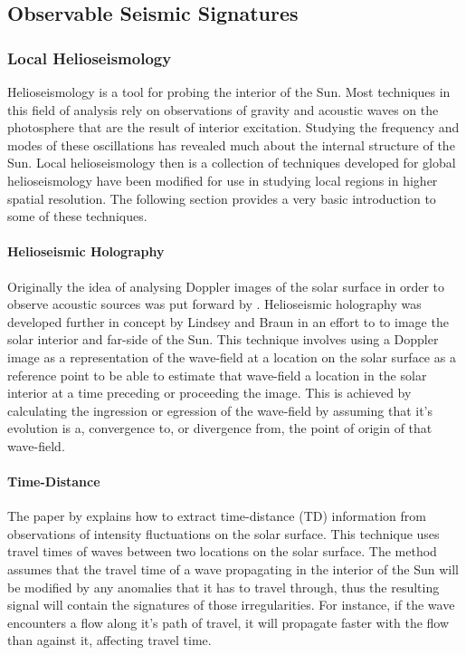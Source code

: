 \subsection{Observable Seismic Signatures}
\subsubsection{Local Helioseismology}






Helioseismology is a tool for probing the interior of the Sun. Most techniques in this field of analysis rely on observations of gravity and acoustic waves on the photosphere that are the result of interior excitation. Studying the frequency and modes of these oscillations has revealed much about the internal structure of the Sun. Local helioseismology then is a collection of techniques developed for global helioseismology have been modified for use in studying local regions in higher spatial resolution. The following section provides a very basic introduction to some of these techniques. 


\paragraph{Helioseismic Holography}\label{helioholog}
Originally the idea of analysing Doppler images of the solar surface in order to observe acoustic sources was put forward by \cite{1975CRASB.281...93R}. Helioseismic holography was developed further in concept by Lindsey and Braun \citep{1990SoPh..126..101L, 1992ApJ...392..739B, 1997ApJ...485..895L} in an effort to to image the solar interior and far-side of the Sun. This technique involves using a Doppler image as a representation of the wave-field at a location on the solar surface as a reference point to be able to estimate that wave-field a location in the solar interior at a time preceding or proceeding the image. This is achieved by calculating the ingression or egression of the wave-field by assuming that it's evolution is a, convergence to, or divergence from, the point of origin of that wave-field.  



\paragraph{Time-Distance}\label{TD}
The paper by \cite{1993Natur.362..430D} explains how to extract time-distance (TD) information from observations of intensity fluctuations on the solar surface. This technique uses travel times of waves between two locations on the solar surface. The method assumes that the travel time of a wave propagating in the interior of the Sun will be modified by any anomalies that it has to travel through, thus the resulting signal will contain the signatures of those irregularities. For instance, if the wave encounters a flow along it's path of travel, it will propagate faster with the flow than against it, affecting travel time.     

